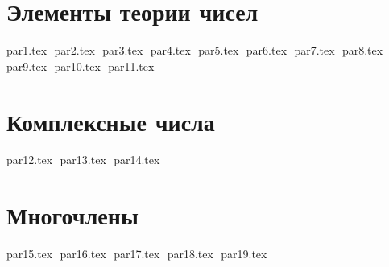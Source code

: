 



\gdef\CourseName{Алгебра}
\author{Лектор: Жуков Игорь Борисович} 
\date{}

\makefirstpages

\section*{Элементы теории чисел}

{par1.tex}
$ $
{par2.tex}
$ $
{par3.tex}
$ $
{par4.tex}
$ $
{par5.tex}
$ $
{par6.tex}
$ $
{par7.tex}
$ $
{par8.tex}
$ $
{par9.tex}
$ $
{par10.tex}
$ $
{par11.tex}
$ $
\pagebreak

\section*{Комплексные числа}

{par12.tex}
$ $
{par13.tex}
$ $
{par14.tex}
$ $
\pagebreak

\section*{Многочлены}

{par15.tex}
$ $
{par16.tex}
$ $
{par17.tex}
$ $
{par18.tex}
$ $
{par19.tex}
$ $

 